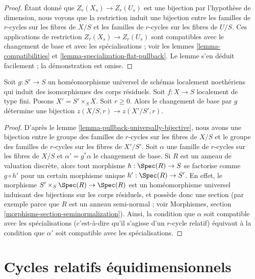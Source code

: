 \begin{proof} Étant
 donné que  $Z_r(X_s) \to Z_r(U_s)$  est une bijection par l'hypothèse de dimension, 
nous voyons que la restriction induit une bijection entre les
 familles de $r$-cycles sur les fibres de  $X/S$  et 
les familles de $r$-cycles sur les fibres de  $U/S$.
 Ces applications de restriction  $Z_r(X_s) \to Z_r(U_s)$  sont
 compatibles avec le changement de base et avec les spécialisations ; voir les
 lemmes \ref{lemma-compatibilities} et \ref{lemma-specialization-flat-pullback}. Le 
lemme s'en déduit facilement ; la démonstration est omise. 
\end{proof} 

\begin{lemma} 
\label{lemma-seminormalize-base} 
Soit  $g : S' \to S$  un homéomorphisme universel de schémas localement noethériens 
qui induit des isomorphismes des corps résiduels. Soit  $f : X \to S$  localement de 
type fini. Posons  $X' = S' \times_S X$. Soit  $r \geq 0$. Alors le changement de base par $g$
  détermine une bijection  $z(X/S, r) \to z(X'/S', r)$. 
\end{lemma} 

\begin{proof} 
D'après le lemme \ref{lemma-pullback-universally-bijective}, nous avons une bijection
 entre le groupe des familles de  $r$-cycles sur les fibres de  $X/S$  et
 le groupe des familles de  $r$-cycles sur les fibres de  $X'/S'$. 
Soit  $\alpha$ une famille de  $r$-cycles sur les fibres de  $X/S$  et  
$\alpha' = g^*\alpha$ le changement de base. 
Si  $R$  est un anneau de valuation discrète, alors tout morphisme  
$h : \Spec(R) \to S$  se factorise comme  $g \circ h'$  pour un 
certain morphisme unique  $h' : \Spec(R) \to S'$.
 En effet, le morphisme  $S' \times_S \Spec(R) \to \Spec(R)$  est
 un homéomorphisme universel induisant des bijections sur les corps résiduels,
 et possède donc une section (par exemple parce que  $R$  est un anneau 
semi-normal ; voir Morphismes, section \ref{morphisms-section-seminormalization}). 
Ainsi, la condition que $\alpha$  soit compatible avec les
 spécialisations (c'est-à-dire qu'il s'agisse d'un  $r$-cycle 
relatif) équivaut à la condition que  
$\alpha'$  soit compatible avec les spécialisations. 
\end{proof} 






\section{Cycles relatifs équidimensionnels} 
\label{section-equidimensional} 

